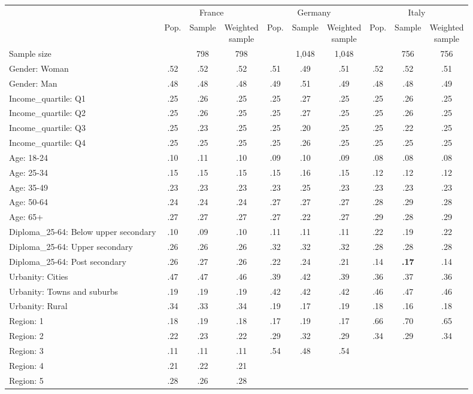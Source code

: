 
\begin{tabular}[t]{lccccccccc}
\toprule
\multicolumn{1}{c}{} & \multicolumn{3}{c}{France} & \multicolumn{3}{c}{Germany} & \multicolumn{3}{c}{Italy} \\
\cmidrule(l{3pt}r{3pt}){2-4} \cmidrule(l{3pt}r{3pt}){5-7} \cmidrule(l{3pt}r{3pt}){8-10}
  & Pop. & Sample & \makecell{Weighted\\sample} & Pop. & Sample & \makecell{Weighted\\sample} & Pop. & Sample & \makecell{Weighted\\sample}\\
\midrule
Sample size &  & 798 & 798 &  & 1,048 & 1,048 &  & 756 & 756\\
\addlinespace
Gender: Woman & .52 & .52 & .52 & .51 & .49 & .51 & .52 & .52 & .51\\
Gender: Man & .48 & .48 & .48 & .49 & .51 & .49 & .48 & .48 & .49\\
\addlinespace
Income\_quartile: Q1 & .25 & .26 & .25 & .25 & .27 & .25 & .25 & .26 & .25\\
Income\_quartile: Q2 & .25 & .26 & .25 & .25 & .27 & .25 & .25 & .26 & .25\\
Income\_quartile: Q3 & .25 & .23 & .25 & .25 & .20 & .25 & .25 & .22 & .25\\
Income\_quartile: Q4 & .25 & .25 & .25 & .25 & .26 & .25 & .25 & .25 & .25\\
\addlinespace
Age: 18-24 & .10 & .11 & .10 & .09 & .10 & .09 & .08 & .08 & .08\\
Age: 25-34 & .15 & .15 & .15 & .15 & .16 & .15 & .12 & .12 & .12\\
Age: 35-49 & .23 & .23 & .23 & .23 & .25 & .23 & .23 & .23 & .23\\
Age: 50-64 & .24 & .24 & .24 & .27 & .27 & .27 & .28 & .29 & .28\\
Age: 65+ & .27 & .27 & .27 & .27 & .22 & .27 & .29 & .28 & .29\\
\addlinespace
Diploma\_25-64: Below upper secondary & .10 & .09 & .10 & .11 & .11 & .11 & .22 & .19 & .22\\
Diploma\_25-64: Upper secondary & .26 & .26 & .26 & .32 & .32 & .32 & .28 & .28 & .28\\
Diploma\_25-64: Post secondary & .26 & .27 & .26 & .22 & .24 & .21 & .14 & \textbf{.17} & .14\\
\addlinespace
Urbanity: Cities & .47 & .47 & .46 & .39 & .42 & .39 & .36 & .37 & .36\\
Urbanity: Towns and suburbs & .19 & .19 & .19 & .42 & .42 & .42 & .46 & .47 & .46\\
Urbanity: Rural & .34 & .33 & .34 & .19 & .17 & .19 & .18 & .16 & .18\\
\addlinespace
Region: 1 & .18 & .19 & .18 & .17 & .19 & .17 & .66 & .70 & .65\\
Region: 2 & .22 & .23 & .22 & .29 & .32 & .29 & .34 & .29 & .34\\
Region: 3 & .11 & .11 & .11 & .54 & .48 & .54 &  &  & \\
Region: 4 & .21 & .22 & .21 &  &  &  &  &  & \\
Region: 5 & .28 & .26 & .28 &  &  &  &  &  & \\
\bottomrule
\end{tabular}
